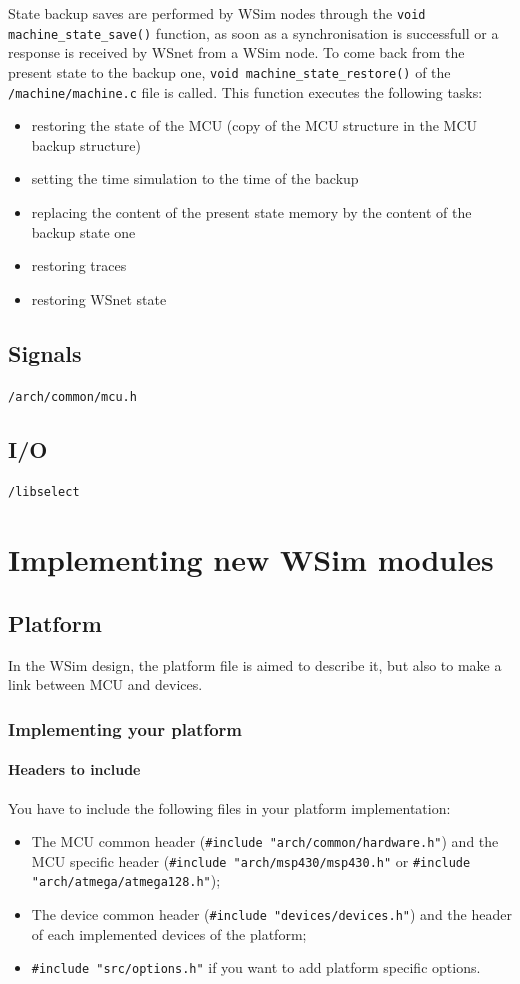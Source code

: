 \documentclass[a4paper,10pt]{report}
\begin{document}
State backup saves are performed by WSim nodes through the \verb$void machine_state_save()$ function, as soon as a synchronisation is successfull or a response is received by WSnet from a WSim node. To come back from the present state to the backup one, \verb$void machine_state_restore()$ of the \verb$/machine/machine.c$ file is called. This function executes the following tasks:
\begin{itemize}
  \item restoring the state of the MCU (copy of the MCU structure in the MCU backup structure)
  \item setting the time simulation to the time of the backup
  \item replacing the content of the present state memory by the content of the backup state one
  \item restoring traces
  \item restoring WSnet state
\end{itemize}

\section{Signals}
\verb$/arch/common/mcu.h$

\section{I/O}
\verb$/libselect$


\chapter{Implementing new WSim modules}

\section{Platform}
In the WSim design, the platform file is aimed to describe it, but also to make a link between MCU and devices.
\subsection{Implementing your platform}
\subsubsection{Headers to include}
You have to include the following files in your platform implementation:
\begin{itemize}
  \item The MCU common header (\verb$#include "arch/common/hardware.h"$) and the MCU specific header (\verb$#include "arch/msp430/msp430.h"$ or \verb$#include "arch/atmega/atmega128.h"$);
  \item The device common header (\verb$#include "devices/devices.h"$) and the header of each implemented devices of the platform;
  \item \verb$#include "src/options.h"$ if you want to add platform specific options.
\end{itemize}
\end{document}
